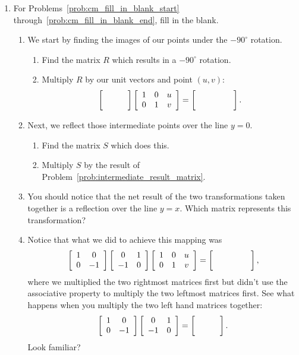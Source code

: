 \documentclass[../gatm.tex]{subfiles}
\begin{document}
\begin{enumerate}
\item For Problems~\ref{prob:cm_fill_in_blank_start} through~\ref{prob:cm_fill_in_blank_end}, fill in the blank.
\begin{enumerate}
\item We start by finding the images of our points under the $-90^\circ$ rotation. \label{prob:cm_fill_in_blank_start}
\begin{enumerate}
\item Find the matrix $R$ which results in a $-90^\circ$ rotation.
\item  \label{prob:intermediate_result_matrix} Multiply $R$ by our unit vectors and point $(u,v)$: $$\blanktwomat\left[\begin{array}{ccc} 1 & 0 & u \\ 0 & 1 & v \end{array}\right] = \left[\phantom{\begin{array}{ccc} 1 & 0 & u \\ 0 & 1 & v \end{array}}\right].$$
\end{enumerate}
\item Next, we reflect those intermediate points over the line $y=0$.
\begin{enumerate}
\item Find the matrix $S$ which does this.
\item Multiply $S$ by the result of Problem~\ref{prob:intermediate_result_matrix}.
\end{enumerate}
\item You should notice that the net result of the two transformations taken together is a reflection over the line $y=x$. Which matrix represents this transformation?
\item Notice that what we did to achieve this mapping was $$\twomat{1}{0}{0}{-1}\twomat{0}{1}{-1}{0}\left[\begin{array}{ccc} 1 & 0 & u \\ 0 & 1 & v \end{array}\right]=\left[\phantom{\begin{array}{ccc} 1 & 0 & u \\ 0 & 1 & v \end{array}}\right],$$
where we multiplied the two rightmost matrices first but didn't use the associative property to multiply the two leftmost matrices first. See what happens when you multiply the two left hand matrices together: $$\twomat{1}{0}{0}{-1}\twomat{0}{1}{-1}{0}=\blanktwomat.$$ Look familiar?

\end{enumerate}
\end{enumerate}
\end{document}
